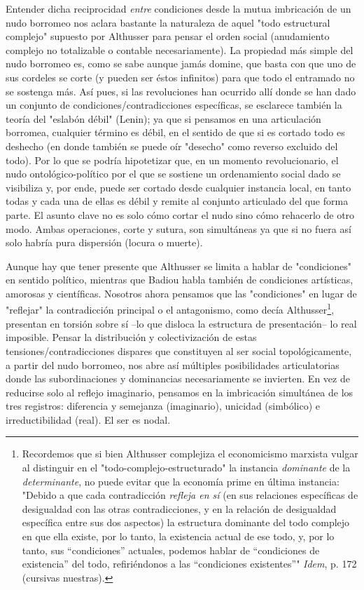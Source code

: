 Entender dicha reciprocidad \emph{entre} condiciones desde la mutua
imbricación de un nudo borromeo nos aclara bastante la naturaleza de
aquel "todo estructural complejo" supuesto por Althusser para pensar el
orden social (anudamiento complejo no totalizable o contable
necesariamente). La propiedad más simple del nudo borromeo es, como se
sabe aunque jamás domine, que basta con que uno de sus cordeles se corte
(y pueden ser éstos infinitos) para que todo el entramado no se sostenga
más. Así pues, si las revoluciones han ocurrido allí donde se han dado
un conjunto de condiciones/contradicciones específicas, se esclarece
también la teoría del "eslabón débil" (Lenin); ya que si pensamos en una
articulación borromea, cualquier término es débil, en el sentido de que
si es cortado todo es deshecho (en donde también se puede oír "desecho"
como reverso excluido del todo). Por lo que se podría hipotetizar que,
en un momento revolucionario, el nudo ontológico-político por el que se
sostiene un ordenamiento social dado se visibiliza y, por ende, puede
ser cortado desde cualquier instancia local, en tanto todas y cada una
de ellas es débil y remite al conjunto articulado del que forma parte.
El asunto clave no es solo cómo cortar el nudo sino cómo rehacerlo de
otro modo. Ambas operaciones, corte y sutura, son simultáneas ya que si
no fuera así solo habría pura dispersión (locura o muerte).

Aunque hay que tener presente que Althusser se limita a hablar de
"condiciones" en sentido político, mientras que Badiou habla también de
condiciones artísticas, amorosas y científicas. Nosotros ahora pensamos
que las "condiciones" en lugar de "reflejar" la contradicción principal
o el antagonismo, como decía Althusser\footnote{Recordemos que si bien
  Althusser complejiza el economicismo marxista vulgar al distinguir en
  el "todo-complejo-estructurado" la instancia \emph{dominante} de la
  \emph{determinante}, no puede evitar que la economía prime en última
  instancia: "Debido a que cada contradicción \emph{refleja en sí} (en
  sus relaciones específicas de desigualdad con las otras
  contradicciones, y en la relación de desigualdad específica entre sus
  dos aspectos) la estructura dominante del todo complejo en que ella
  existe, por lo tanto, la existencia actual de ese todo, y, por lo
  tanto, sus ``condiciones'' actuales, podemos hablar de ``condiciones
  de existencia'' del todo, refiriéndonos a las ``condiciones
  existentes''" \emph{Idem}, p. 172 (cursivas nuestras).}, presentan en
torsión sobre sí --lo que disloca la estructura de presentación-- lo
real imposible. Pensar la distribución y colectivización de estas
tensiones/contradicciones dispares que constituyen al ser social
topológicamente, a partir del nudo borromeo, nos abre así múltiples
posibilidades articulatorias donde las subordinaciones y dominancias
necesariamente se invierten. En vez de reducirse solo al reflejo
imaginario, pensamos en la imbricación simultánea de los tres registros:
diferencia y semejanza (imaginario), unicidad (simbólico) e
irreductibilidad (real). El ser es nodal.

